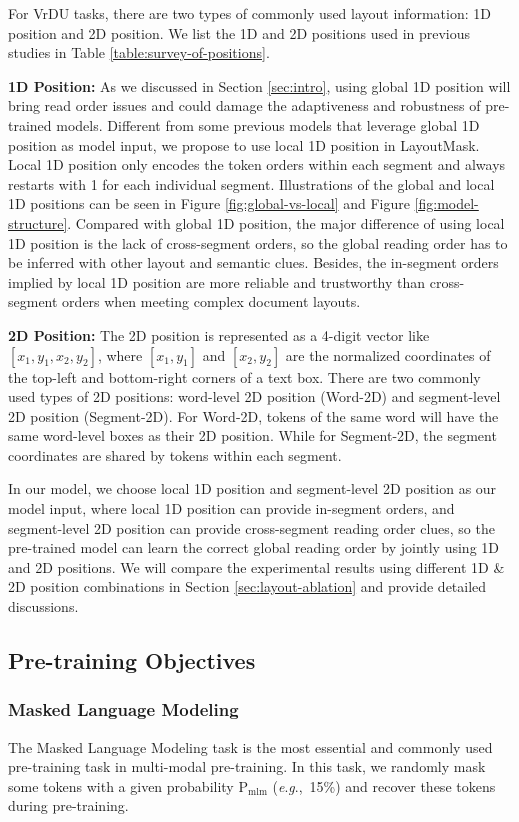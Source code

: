 \documentclass[11pt]{article}
\newcommand{\eg}{\textit{e}.\textit{g}.,\ }
\begin{document}
For VrDU tasks, there are two types of commonly used layout information: 1D position and 2D position. 
We list the 1D and 2D positions used in previous studies in Table \ref{table:survey-of-positions}.

\textbf{1D Position:}
As we discussed in Section \ref{sec:intro}, using global 1D position will bring read order issues and could damage the adaptiveness and robustness of pre-trained models.
Different from some previous models that leverage global 1D position as model input, we propose to use local 1D position in LayoutMask.
Local 1D position only encodes the token orders within each segment and always restarts with 1 for each individual segment.
 Illustrations of the global and local 1D positions can be seen in Figure \ref{fig:global-vs-local} and Figure \ref{fig:model-structure}. 
 Compared with global 1D position, the major difference of using local 1D position is the lack of cross-segment orders, so the global reading order has to be inferred with other layout and semantic clues. Besides, the in-segment orders implied by local 1D position are more reliable and trustworthy than cross-segment orders when meeting complex document layouts.


 \textbf{2D Position:}
The 2D position is represented as a 4-digit vector like $[x_1, y_1, x_2, y_2]$, where $[x_1, y_1]$ and $[x_2, y_2]$ are the normalized coordinates of the top-left and bottom-right corners of a text box.
There are two commonly used types of 2D positions: word-level 2D position (Word-2D) and segment-level 2D position (Segment-2D). 
For Word-2D, tokens of the same word will have the same word-level boxes as their 2D position. While for Segment-2D, the segment coordinates are shared by tokens within each segment.   

In our model, we choose local 1D position and segment-level 2D position as our model input, where local 1D position can provide in-segment orders, and segment-level 2D position can provide cross-segment reading order clues, so the pre-trained model can learn the correct global reading order by jointly using 1D and 2D positions.  
We will compare the experimental results using different 1D \& 2D position combinations in Section \ref{sec:layout-ablation} and provide detailed discussions. 

\subsection{Pre-training Objectives}
\label{sec:pretrain-tasks}
\subsubsection{Masked Language Modeling}
\label{sec:mlm}
The Masked Language Modeling task is the most essential and commonly used pre-training task in multi-modal pre-training.
In this task, we randomly mask some tokens with a given probability $\mathrm{P}_\mathrm{mlm}$ (\eg 15\%) and recover these tokens during pre-training.
\end{document}
